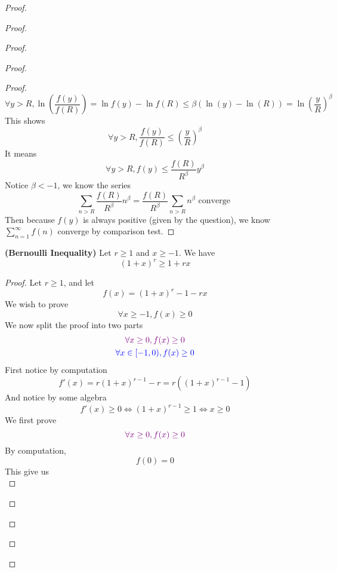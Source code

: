 \documentclass{report}
\begin{document}
\begin{proof}
\begin{proof}
\begin{proof}
\begin{proof}
\begin{proof}
\begin{equation}
\forall y>R,\ln ( \frac{f(y)}{f(R)})=\ln f(y)-\ln f(R)\leq \beta (\ln(y)-\ln(R))= \ln(\frac{y}{R})^\beta 
\end{equation}
This shows
\begin{equation}
\forall y>R, \frac{f(y)}{f(R)}\leq (\frac{y}{R})^{\beta }
\end{equation}
It means
\begin{equation}
\forall y>R, f(y)\leq \frac{f(R)}{R^{\beta }}y^{\beta }
\end{equation}
Notice $\beta <-1$, we know the series 
\begin{equation}
\sum_{n>R} \frac{f(R)}{R^{\beta }}n^{\beta }=\frac{f(R)}{R^{\beta }}\sum_{n>R}n^{\beta }\text{ converge }
\end{equation}
Then because $f(y)$ is always positive (given by the question), we know $\sum_{n=1}^\infty f(n)$ converge by comparison test.
\end{proof}
\begin{lemma}
\label{8.3.4}
\textbf{(Bernoulli Inequality)} Let  $r\geq 1$ and $x\geq -1$. We have
\begin{equation}
  (1+x)^r\geq 1+rx
\end{equation}
\end{lemma}
\begin{proof}
Let $r\geq 1$, and let
\begin{equation}
f(x)=(1+x)^r-1-rx
\end{equation}
We wish to prove 
\begin{equation}
\forall x\geq -1, f(x)\geq 0
\end{equation}
We now split the proof into two parts
\begin{gather}
  \textcolor{violet}{\forall x\geq 0, f(x)\geq 0}\\
  \textcolor{blue}{\forall x\in [-1,0), f(x)\geq 0}
\end{gather}
First notice by computation
\begin{equation}
f'(x)=r(1+x)^{r-1}-r=r((1+x)^{r-1}-1)
\end{equation}
And notice by some algebra
\begin{equation}
f'(x)\geq 0\iff  (1+x)^{r-1}\geq 1\iff  x\geq 0
\end{equation}
We first prove 
\begin{equation}
\textcolor{violet}{\forall x\geq 0, f(x)\geq 0}
\end{equation}
By computation,
\begin{equation}
f(0)=0
\end{equation}
This give us 
\begin{equation}

\end{equation}
\end{proof}
\end{proof}
\end{proof}
\end{proof}
\end{proof}
\end{document}
